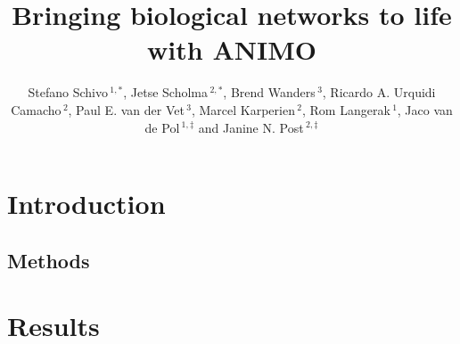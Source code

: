 \documentclass{bioinfo}
\begin{document}


\title[Bringing biological networks to life with ANIMO]{Bringing biological networks to life with ANIMO}

\author[Schivo, Scholma \textit{et~al}]{Stefano Schivo\,$^{1,*}$, Jetse Scholma\,$^{2,*}$, Brend Wanders\,$^3$, Ricardo A. Urquidi Camacho\,$^2$, Paul E. van der Vet\,$^3$, Marcel Karperien\,$^2$, Rom Langerak\,$^1$, Jaco van de Pol\,$^{1,\ddag}$ and Janine N. Post\,$^{2,\ddag}$}

\address{$^{1}$Formal Methods and Tools, Faculty of EEMCS, University of Twente, 7522NH Enschede, The~Netherlands;
$^{2}$Developmental BioEngineering, MIRA Institute for Biomedical Technology and Technical Medicine, University of Twente, 7522NH Enschede, The~Netherlands;
$^{3}$Human Media Interaction, Faculty of EEMCS, University of Twente, 7522NH Enschede, The~Netherlands}


\history{}%

\editor{}%

\maketitle


\begin{abstract}

\end{abstract}

\let\oldthefootnote\thefootnote
\renewcommand{\thefootnote}{\fnsymbol{footnote}}
\let\thefootnote\oldthefootnote


\section{Introduction}\label{sec:introduction}



\begin{methods}
\section{Methods}

\end{methods}




\section{Results}\label{sec:results}

\end{document}
